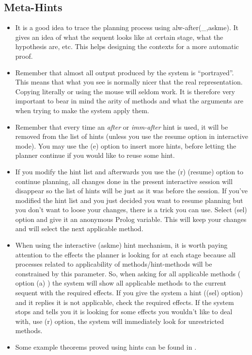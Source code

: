 \subsection {Meta-Hints}
\begin{itemize}

\item It is a good idea to trace the planning process using
alw-after(\_,askme). It gives an idea of what the sequent
looks like at certain stage, what the hypothesis are, etc. This helps
designing the contexts for a more automatic proof.

\item Remember that almost all output produced by the system is
``portrayed''. This means that what you see is normally nicer that the
real representation. Copying literally or using the mouse will seldom
work. It is therefore very important to bear in mind the arity of methods
and what the arguments are when trying to make the system apply them.

\item Remember that every time an {\em after\/} or {\em imm-after\/} hint
is used, it will be removed from the list of hints (unless you use the
resume option in interactive mode). You may use the (e) option to
insert more hints, before letting the planner continue if you would
like to reuse some hint.

\item If you modify the hint list and afterwards you use the (r)
(resume) option to continue planning, all changes done in the present
interactive session will disappear so the list of hints will be just as
it was before the session. If you've modified the hint list and you
just decided you want to resume planning but you don't want to loose
your changes, there is a trick you can use. Select (sel) option and
give it an anonymous Prolog variable. This will keep your changes and
will select the next applicable method.

\item When using the interactive (askme) hint mechanism, it is worth
paying attention to the effects the planner is looking for at each
stage because all processes related to applicability of
methods/hint-methods will be constrained by this parameter. So, when
asking for all applicable methods ( option (a) ) the system will show
all applicable methods to the current sequent with the required
effects. If you give the system a hint ((sel) option) and it replies it
is not applicable, check the required effects. If the system stops and
tells you it is looking for some effects you wouldn't like to deal
with, use (r) option, the system will immediately look for unrestricted
methods.

\item Some example theorems proved using hints can be found in \cite{tp8}.
\end{itemize}


